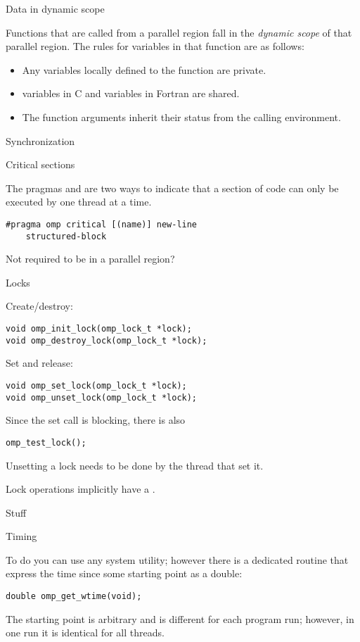  {Data in dynamic scope}

Functions that are called from a parallel region fall in the
\emph{dynamic scope} of that
parallel region. The rules for variables in that function are as follows:
\begin{itemize}
\item Any variables locally defined to the function are private.
\item {} variables in C and  variables in Fortran
  are shared.
\item The function arguments inherit their status from the calling environment.
\end{itemize}

 {Synchronization}

 {Critical sections}
\label{sec:ref:critical}

The pragmas  and 
are two ways to indicate that a section of code can only be executed
by one thread at a time.

\begin{verbatim}
#pragma omp critical [(name)] new-line
    structured-block
\end{verbatim}

Not required to be in a parallel region?

 {Locks}
\label{ompref:locks}

Create/destroy:
\begin{verbatim}
void omp_init_lock(omp_lock_t *lock);
void omp_destroy_lock(omp_lock_t *lock);
\end{verbatim}
Set and release:
\begin{verbatim}
void omp_set_lock(omp_lock_t *lock);
void omp_unset_lock(omp_lock_t *lock);
\end{verbatim}
Since the set call is blocking, there is also 
\begin{verbatim}
omp_test_lock();
\end{verbatim}

Unsetting a lock needs to be done by the thread that set it.

Lock operations implicitly have a .

 {Stuff}

 {Timing}
\label{sec:ref:omp-timing}

To do  you can use any system utility;
however there is a dedicated routine 
that express the time since some starting point as a double:
\begin{verbatim}
double omp_get_wtime(void);
\end{verbatim}
The starting point is arbitrary and is different for each program run;
however, in one run it is identical for all threads.

